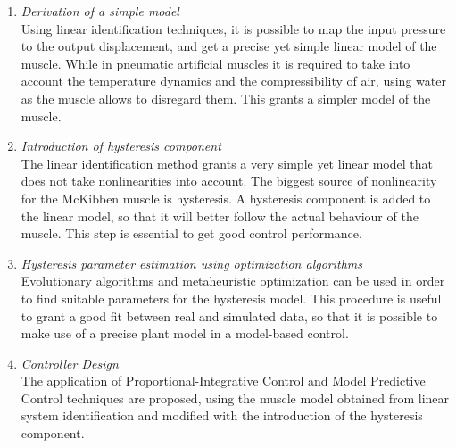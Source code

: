 \begin{enumerate}
	\item \textit{Derivation of a simple model} \smallskip \\ 
	Using linear identification techniques, it is possible to map the input pressure to the output displacement,
	and get a precise yet simple linear model of the muscle.
	While in pneumatic artificial muscles it is required to take into account
	the temperature dynamics and the compressibility of air, using water as the muscle
	allows to disregard them. This grants a simpler model of the muscle.
	
	\item \textit{Introduction of hysteresis component} \smallskip \\ 
	The linear identification method grants a very simple yet linear model
	that does not take nonlinearities into account. 
	The biggest source of nonlinearity for the McKibben muscle is hysteresis.
	A hysteresis component is added to the linear model, 
	so that it will	better follow the actual behaviour of the muscle.
	This step is essential to get good control performance.
	
	\item \textit{Hysteresis parameter estimation using optimization algorithms}\smallskip \\
	Evolutionary algorithms and metaheuristic optimization can be used in order
	to find suitable parameters for the hysteresis model. 
	This procedure is useful to grant a good fit between real and simulated data,
	so that it is possible to make use of a precise plant model in a model-based control.
	
	\item \textit{Controller Design} \smallskip \\
	The application of Proportional-Integrative Control and Model Predictive Control
	techniques are proposed, using the muscle model obtained from
	linear system identification and modified with the introduction
	of the hysteresis component.
	
	
	
\end{enumerate}









